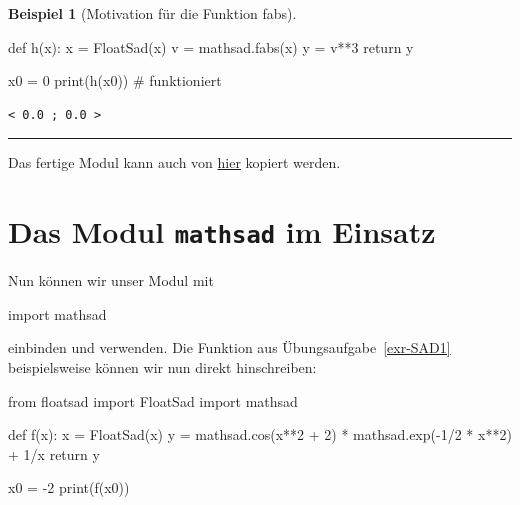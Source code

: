\documentclass[
  a4paper,
  DIV=11]{scrreprt}
\newenvironment{Shaded}{\begin{snugshade}}{\end{snugshade}}
\newcommand{\BuiltInTok}[1]{\textcolor[rgb]{0.00,0.23,0.31}{#1}}
\newcommand{\CommentTok}[1]{\textcolor[rgb]{0.37,0.37,0.37}{#1}}
\newcommand{\ControlFlowTok}[1]{\textcolor[rgb]{0.00,0.23,0.31}{#1}}
\newcommand{\DecValTok}[1]{\textcolor[rgb]{0.68,0.00,0.00}{#1}}
\newcommand{\ImportTok}[1]{\textcolor[rgb]{0.00,0.46,0.62}{#1}}
\newcommand{\KeywordTok}[1]{\textcolor[rgb]{0.00,0.23,0.31}{#1}}
\newcommand{\NormalTok}[1]{\textcolor[rgb]{0.00,0.23,0.31}{#1}}
\newcommand{\OperatorTok}[1]{\textcolor[rgb]{0.37,0.37,0.37}{#1}}
\theoremstyle{definition}
\theoremstyle{definition}
\newtheorem{example}{Beispiel}[chapter]
\theoremstyle{remark}
\begin{document}
\begin{example}[Motivation für die Funktion
fabs]
\begin{Shaded}
\begin{Highlighting}[]
\KeywordTok{def}\NormalTok{ h(x):}
\NormalTok{    x }\OperatorTok{=}\NormalTok{ FloatSad(x)}
\NormalTok{    v }\OperatorTok{=}\NormalTok{ mathsad.fabs(x)}
\NormalTok{    y }\OperatorTok{=}\NormalTok{ v}\OperatorTok{**}\DecValTok{3}
    \ControlFlowTok{return}\NormalTok{ y}

\NormalTok{x0 }\OperatorTok{=} \DecValTok{0}
\BuiltInTok{print}\NormalTok{(h(x0)) }\CommentTok{\# funktioniert}
\end{Highlighting}
\end{Shaded}

\begin{verbatim}
< 0.0 ; 0.0 >
\end{verbatim}

\end{example}

\begin{center}\rule{0.5\linewidth}{0.5pt}\end{center}

Das fertige Modul kann auch von \href{mathsad.py}{hier} kopiert werden.

\hypertarget{das-modul-mathsad-im-einsatz}{%
\section{\texorpdfstring{Das Modul \texttt{mathsad} im
Einsatz}{Das Modul mathsad im Einsatz}}\label{das-modul-mathsad-im-einsatz}}

Nun können wir unser Modul mit

\begin{Shaded}
\begin{Highlighting}[]
\ImportTok{import}\NormalTok{ mathsad}
\end{Highlighting}
\end{Shaded}

einbinden und verwenden. Die Funktion aus Übungsaufgabe~\ref{exr-SAD1}
beispielsweise können wir nun direkt hinschreiben:

\begin{Shaded}
\begin{Highlighting}[]
\ImportTok{from}\NormalTok{ floatsad }\ImportTok{import}\NormalTok{ FloatSad}
\ImportTok{import}\NormalTok{ mathsad}

\KeywordTok{def}\NormalTok{ f(x):}
\NormalTok{    x }\OperatorTok{=}\NormalTok{ FloatSad(x)}
\NormalTok{    y }\OperatorTok{=}\NormalTok{ mathsad.cos(x}\OperatorTok{**}\DecValTok{2} \OperatorTok{+} \DecValTok{2}\NormalTok{) }\OperatorTok{*}\NormalTok{ mathsad.exp(}\OperatorTok{{-}}\DecValTok{1}\OperatorTok{/}\DecValTok{2} \OperatorTok{*}\NormalTok{ x}\OperatorTok{**}\DecValTok{2}\NormalTok{) }\OperatorTok{+} \DecValTok{1}\OperatorTok{/}\NormalTok{x}
    \ControlFlowTok{return}\NormalTok{ y}

\NormalTok{x0 }\OperatorTok{=} \OperatorTok{{-}}\DecValTok{2}
\BuiltInTok{print}\NormalTok{(f(x0))}
\end{Highlighting}
\end{Shaded}
\end{document}
